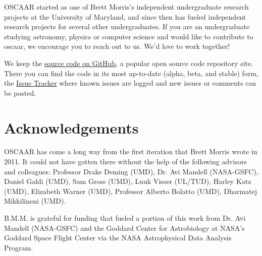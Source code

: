 \documentclass[a4paper]{article}
\begin{document}
OSCAAR started as one of Brett Morris's independent undergraduate research projects at the University of Maryland, and since then has fueled independent research projects for several other undergraduates. If you are an undergraduate studying astronomy, physics or computer science and would like to contribute to oscaar, we encourage you to reach out to us. We'd love to work together! 

We keep the \href{https://github.com/OSCAAR/OSCAAR}{source code on GitHub}, a popular open source code repository site. There you can find the code in its most up-to-date (alpha, beta, and stable) form, the \href{https://github.com/OSCAAR/OSCAAR/issues?state=open}{Issue Tracker} where known issues are logged and new issues or comments can be posted.


\section{Acknowledgements}
OSCAAR has come a long way from the first iteration that Brett Morris wrote in 2011. It could not have gotten there without the help of the following advisors and colleagues: 
Professor Drake Deming (UMD), Dr. Avi Mandell (NASA-GSFC), Daniel Galdi (UMD), Sam Gross (UMD), Luuk Visser (UL/TUD), Harley Katz (UMD), Elizabeth Warner (UMD), Professor Alberto Bolatto (UMD), Dharmatej Mikkilineni (UMD).

B.M.M. is grateful for funding that fueled a portion of this work from Dr. Avi Mandell (NASA-GSFC) and the Goddard Center for Astrobiology at NASA's Goddard Space Flight Center via the NASA Astrophysical Data Analysis Program. 
\end{document}
